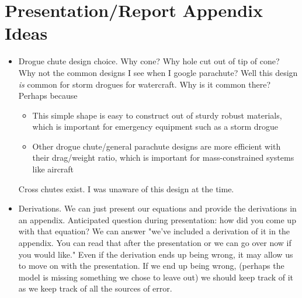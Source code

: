 \documentclass[12pt,journal,compsoc]{IEEEtran}
\begin{document}
\section{Presentation/Report Appendix Ideas}
\begin{itemize}
\item Drogue chute design choice. Why cone? Why hole cut out of tip of cone? Why not the common designs I see when I google parachute? Well this design {\it is} common for storm drogues for watercraft. Why is it common there? Perhaps because 
\begin{itemize}
\item This simple shape is easy to construct out of sturdy robust materials, which is important for emergency equipment such as a storm drogue
\item Other drogue chute/general parachute designs are more efficient with their drag/weight ratio, which is important for mass-constrained systems like aircraft
\end{itemize}
Cross chutes exist. I was unaware of this design at the time.

\item Derivations. We can just present our equations and provide the derivations in an appendix. Anticipated question during presentation: how did you come up with that equation? We can answer "we've included a derivation of it in the appendix. You can read that after the presentation or we can go over now if you would like." Even if the derivation ends up being wrong, it may allow us to move on with the presentation. If we end up being wrong, (perhaps the model is missing something we chose to leave out) we should keep track of it as we keep track of all the sources of error. 
\end{itemize}
\end{document}

